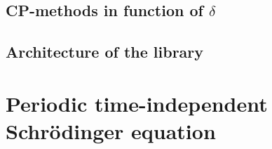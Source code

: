 \cite{baeyens_fast_2020}

\subsection{CP-methods in function of \texorpdfstring{$\delta$}{delta}}

\subsection{Architecture of the \texorpdfstring{\cpp}{C++} library}

\section{Periodic \texorpdfstring{\oneD}{1D} time-independent Schrödinger equation}
\label{sec:1d_periodic}

\begin{theorem}

\end{theorem}
\cite{binding_prufer_2012}

\stopchapter
